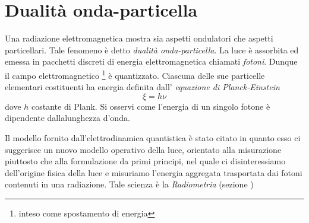 \begin{figure}[t]
	\label{chapter1:EMwave}
\end{figure}
%
\section{Dualit\`a onda-particella}
Una radiazione elettromagnetica mostra sia aspetti ondulatori che aspetti particellari. Tale fenomeno \`e detto \textit{dualit\`a onda-particella}.
La luce \`e assorbita ed emessa in pacchetti discreti di energia elettromagnetica chiamati \textit{fotoni}. Dunque il campo elettromagnetico
\footnote{inteso come spostamento di energia} \`e quantizzato. Ciascuna delle sue particelle elementari costituenti ha energia definita dall'
\textit{equazione di Planck-Einstein} 
\[\xi = h\nu\] 
dove $h$ costante di Plank. Si osservi come l'energia di un singolo fotone \`e dipendente dallalunghezza d'onda.\par

Il modello fornito dall'elettrodinamica quantistica \`e stato citato in quanto esso ci suggerisce un nuovo modello operativo della luce, orientato 
alla misurazione piuttosto che alla formulazione da primi principi, nel quale ci disinteressiamo dell'origine fisica della luce e misuriamo
l'energia aggregata trasportata dai fotoni contenuti in una radiazione. Tale scienza \`e la \textit{Radiometria} (sezione )\par


